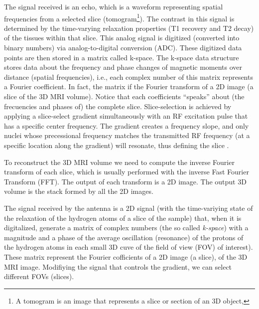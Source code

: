 The signal received is an echo, which is a waveform representing
spatial frequencies from a selected slice (tomogram\footnote{A
  tomogram is an image that represents a slice or section of an 3D
  object,}). The contrast in this signal is determined by the
time-varying relaxation properties (T1 recovery and T2 decay) of the
tissues within that slice. This analog signal is digitized (converted
into binary numbers) via analog-to-digital conversion (ADC). These
digitized data points are then stored in a matrix called k-space. The
k-space data structure stores data about the frequency and phase
changes of magnetic moments over distance (spatial frequencies), i.e.,
each complex number of this matrix represents a Fourier
coefficient. In fact, the matrix if the Fourier transform of a 2D
image (a slice of the 3D MRI volume). Notice that each coefficients
``speaks'' about (the frecuencies and phases of) the complete
slice. Slice-selection is achieved by applying a slice-select gradient
simultaneously with an RF excitation pulse that has a specific center
frequency. The gradient creates a frequency slope, and only nuclei
whose precessional frequency matches the transmitted RF frequency (at
a specific location along the gradient) will resonate, thus defining
the slice \cite{westbrook2018mri}.

To reconstruct the 3D MRI volume we need to compute the inverse
Fourier transform of each slice, which is usually performed with the
inverse Fast Fourier Transform (FFT). The output of each transform is
a 2D image. The output 3D volume is the stack formed by all the 2D
images.

The signal received by the antenna is a 2D signal (with the
time-variying state of the relaxation of the hydrogen atoms of a slice
of the sample) that, when it is digitalized, generate a matrix of
complex numbers (the so called \emph{k-space}) with a magnitude and a
phase of the average oscillation (resonance) of the protons of the
hydrogen atoms in each small 3D cuve of the field of view (FOV) of
interest). These matrix represent the Fourier cofficients of a 2D
image (a slice), of the 3D MRI image. Modifiying the signal that
controls the gradient, we can select different FOVs (slices).

